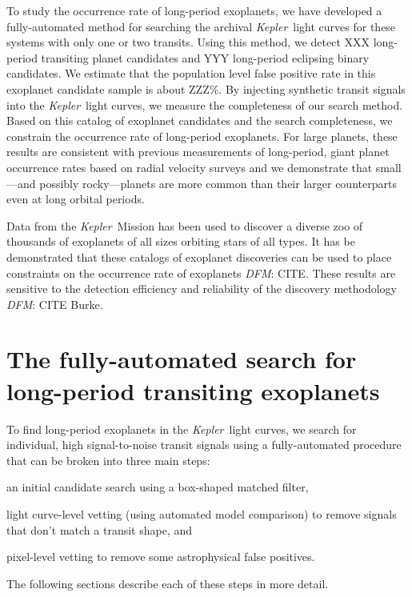 \documentclass[twocolumn]{aastex6}
\newcommand{\project}[1]{\textsl{#1}}
\newcommand{\kepler}{\project{Kepler}}
\newcommand{\todo}[3]{{\color{#2}\emph{#1}: #3}}
\newcommand{\dfmtodo}[1]{\todo{DFM}{red}{#1}}
\begin{document}
To study the occurrence rate of long-period exoplanets, we have developed a
fully-automated method for searching the archival \kepler\ light curves for
these systems with only one or two transits.
Using this method, we detect XXX long-period transiting planet candidates and
YYY long-period eclipsing binary candidates.
We estimate that the population level false positive rate in this exoplanet
candidate sample is about ZZZ\%.
By injecting synthetic transit signals into the \kepler\ light curves, we
measure the completeness of our search method.
Based on this catalog of exoplanet candidates and the search completeness, we
constrain the occurrence rate of long-period exoplanets.
For large planets, these results are consistent with previous measurements of
long-period, giant planet occurrence rates based on radial velocity surveys
and we demonstrate that small---and possibly rocky---planets are more common
than their larger counterparts even at long orbital periods.

Data from the \kepler\ Mission has been used to discover a diverse zoo of
thousands of exoplanets of all sizes orbiting stars of all types.
It has be demonstrated that these catalogs of exoplanet discoveries can be
used to place constraints on the occurrence rate of exoplanets \dfmtodo{CITE}.
These results are sensitive to the detection efficiency and reliability of the
discovery methodology \dfmtodo{CITE Burke}.

\section{The fully-automated search for long-period transiting exoplanets}

To find long-period exoplanets in the \kepler\ light curves, we search for
individual, high signal-to-noise transit signals using a fully-automated
procedure that can be broken into three main steps:
\begin{enumerate}
{\item an initial candidate search using a box-shaped matched filter,}
{\item light curve-level vetting (using automated model comparison) to remove
signals that don't match a transit shape, and}
{\item pixel-level vetting to remove some astrophysical false positives.}
\end{enumerate}
The following sections describe each of these steps in more detail.
\end{document}
